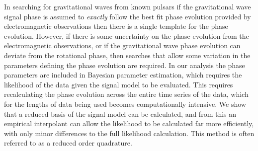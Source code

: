 In searching for gravitational waves from known pulsars if the gravitational wave signal phase is assumed to
{\it exactly} follow the best fit phase evolution provided by electromagnetic observations then there is a single
template for the phase evolution. However, if there is some uncertainty on the phase evolution from the
electromagnetic observations, or if the gravitational wave phase evolution can deviate from the rotational phase,
then searches that allow some variation in the parameters defining the phase evolution are required. In our
analysis the phase parameters are included in Bayesian parameter estimation, which requires the likelihood of the
data given the signal model to be evaluated. This requires recalculating the phase evolution across the entire
time series of the data, which for the lengths of data being used becomes computationally intensive. We show that
a reduced basis of the signal model can be calculated, and from this an empirical interpolant can allow the
likelihood to be calculated far more efficiently, with only minor differences to the full likelihood calculation.
This method is often referred to as a reduced order quadrature.
